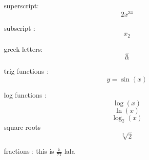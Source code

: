\documentclass[12pt]{article}
\begin{document}
superscript:	$$2x^{34}$$

subscript :
$$x_2	$$

greek letters:
$$\pi$$
$$\alpha	$$

trig functions :
$$y=\sin(x)$$

log functions :
$$\log(x)$$
$$\ln(x)$$
$$\log_2(x)$$
square roots
$$\sqrt[3]{2}	$$

fractions :
this is $\displaystyle{\frac{5}{77}}$ lala
\end{document}
